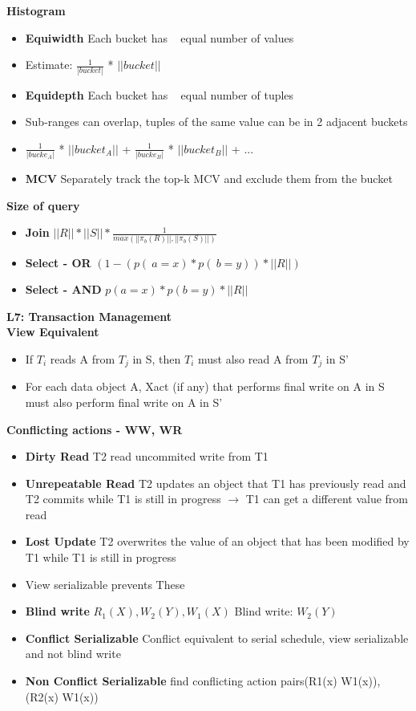 \documentclass[10pt, landscape]{article}
\begin{document}
\begin{multicols}{4}
\textbf{Histogram} \\ 
\begin{itemize}
  \item \textbf{Equiwidth} Each bucket has ~ equal number of values
  \item Estimate: $\frac{1}{|bucket|}$ * $||bucket||$
  \item \textbf{Equidepth} Each bucket has ~ equal number of tuples
  \item Sub-ranges can overlap, tuples of the same value can be in 2 adjacent buckets
  \item $\frac{1}{|bucke_A|}$ * $||bucket_A||$ + $\frac{1}{|bucke_B|}$ * $||bucket_B||$ + ...
  \item \textbf{MCV} Separately track the top-k MCV and exclude them from the bucket
\end{itemize}

\textbf{Size of query}  \\
\begin{itemize}
  \item \textbf{Join} $||R||*||S||* \frac{1}{max(||\pi_b(R)||,||\pi_b(S)||)}$
  \item \textbf{Select - OR} $(1-(p(~a=x)*p(~b=y))*||R||)$
  \item \textbf{Select - AND} $p(a=x)*p(b=y)*||R||$
\end{itemize}

\textbf{\large{L7: Transaction Management}} \\
\textbf{View Equivalent} \\
\begin{itemize}
  \item If $T_i$ reads A from $T_j$ in S, then $T_i$ must also read A from $T_j$ in S'
  \item For each data object A, Xact (if any) that performs final write on A in S must also perform final write on A in S'
\end{itemize}

\textbf{Conflicting actions - WW, WR} \\
\begin{itemize}
  \item \textbf{Dirty Read} T2 read uncommited write from T1
  \item \textbf{Unrepeatable Read} T2 updates an object that T1 has previously read and T2 commits while T1 is still in progress $\rightarrow$ T1 can get a different value from read
  \item \textbf{Lost Update} T2 overwrites the value of an object that has been modified by T1 while T1 is still in progress
  \item View serializable prevents These
  \item \textbf{Blind write} $R_1(X), W_2(Y) , W_1(X)$ Blind write: $W_2(Y)$
  \item \textbf{Conflict Serializable} Conflict equivalent to serial schedule, view serializable and not blind write
  \item \textbf{Non Conflict Serializable} find conflicting action pairs(R1(x) W1(x)), (R2(x) W1(x))  
\end{itemize}


\end{multicols}
\end{document}
